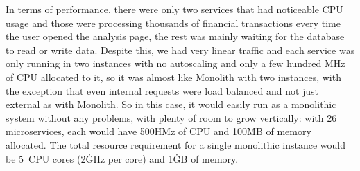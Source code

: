 In terms of performance, there were only two services that had noticeable CPU usage and those were processing thousands of financial transactions every time the user opened the analysis page, the rest was mainly waiting for the database to read or write data. Despite this, we had very linear traffic and each service was only running in two instances with no autoscaling and only a few hundred MHz of CPU allocated to it, so it was almost like Monolith with two instances, with the exception that even internal requests were load balanced and not just external as with Monolith. So in this case, it would easily run as a monolithic system without any problems, with plenty of room to grow vertically: with 26 microservices, each would have 500\.HMz of CPU and 100\.MB of memory allocated. The total resource requirement for a single monolithic instance would be 5~CPU cores (2\.GHz per core) and 1\.GB of memory.

